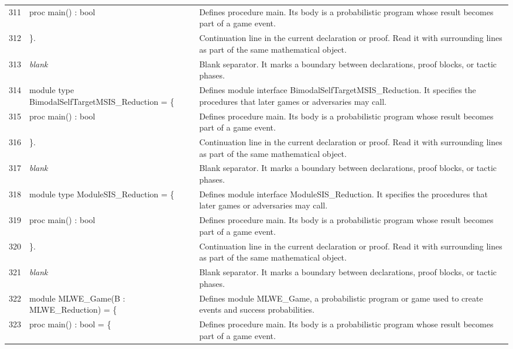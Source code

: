 \documentclass[10pt]{article}
\begin{document}
\begin{longtable}{r L{0.53\textwidth} L{0.37\textwidth}}
311 & {\ttfamily\scriptsize   proc main() : bool} & Defines procedure main.  Its body is a probabilistic program whose result becomes part of a game event. \\
312 & {\ttfamily\scriptsize \}.} & Continuation line in the current declaration or proof.  Read it with surrounding lines as part of the same mathematical object. \\
313 & {\ttfamily\scriptsize \emph{blank}} & Blank separator.  It marks a boundary between declarations, proof blocks, or tactic phases. \\
314 & {\ttfamily\scriptsize module type BimodalSelfTargetMSIS\_Reduction = \{} & Defines module interface BimodalSelfTargetMSIS\_Reduction.  It specifies the procedures that later games or adversaries may call. \\
315 & {\ttfamily\scriptsize   proc main() : bool} & Defines procedure main.  Its body is a probabilistic program whose result becomes part of a game event. \\
316 & {\ttfamily\scriptsize \}.} & Continuation line in the current declaration or proof.  Read it with surrounding lines as part of the same mathematical object. \\
317 & {\ttfamily\scriptsize \emph{blank}} & Blank separator.  It marks a boundary between declarations, proof blocks, or tactic phases. \\
318 & {\ttfamily\scriptsize module type ModuleSIS\_Reduction = \{} & Defines module interface ModuleSIS\_Reduction.  It specifies the procedures that later games or adversaries may call. \\
319 & {\ttfamily\scriptsize   proc main() : bool} & Defines procedure main.  Its body is a probabilistic program whose result becomes part of a game event. \\
320 & {\ttfamily\scriptsize \}.} & Continuation line in the current declaration or proof.  Read it with surrounding lines as part of the same mathematical object. \\
321 & {\ttfamily\scriptsize \emph{blank}} & Blank separator.  It marks a boundary between declarations, proof blocks, or tactic phases. \\
322 & {\ttfamily\scriptsize module MLWE\_Game(B : MLWE\_Reduction) = \{} & Defines module MLWE\_Game, a probabilistic program or game used to create events and success probabilities. \\
323 & {\ttfamily\scriptsize   proc main() : bool = \{} & Defines procedure main.  Its body is a probabilistic program whose result becomes part of a game event. \\

\end{longtable}
\end{document}
